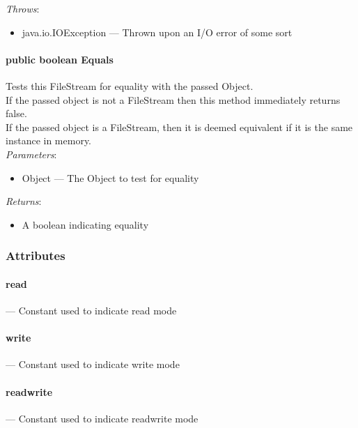 \documentclass[$Date: 2003/06/26 19:29:31 $]{glabarticle}
\begin{document}
\textit{Throws}:
\begin{itemize}
\item[]  java.io.IOException --- Thrown upon an I/O error of some sort
\end{itemize}

\paragraph{public boolean Equals}

Tests this FileStream for equality with the passed Object.\\

If the passed object is not a FileStream then this method immediately returns false. \\

If the passed object is a FileStream, then it is deemed equivalent if it is the same instance in memory. \\

\textit{Parameters}:
\begin{itemize}
\item[] Object --- The Object to test for equality 
\end{itemize}

\textit{Returns}:
\begin{itemize}
\item[] A boolean indicating equality
\end{itemize}



\subsubsection{Attributes}

\paragraph{read} --- Constant used to indicate read mode

\paragraph{write} --- Constant used to indicate write mode

\paragraph{readwrite} --- Constant used to indicate readwrite mode
\end{document}
